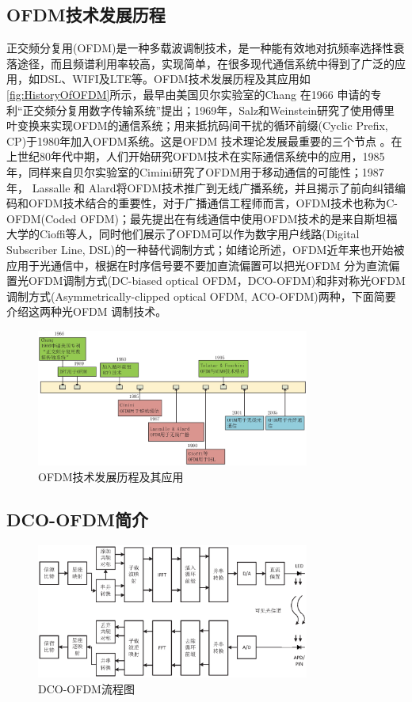 \subsection{OFDM技术发展历程}
正交频分复用(OFDM)是一种多载波调制技术，是一种能有效地对抗频率选择性衰落途径，而且频谱利用率较高，实现简单，在很多现代通信系统中得到了广泛的应用，如DSL、WIFI及LTE等。OFDM技术发展历程及其应用如
\autoref{fig:HistoryOfOFDM}所示，最早由美国贝尔实验室的Chang 在1966 申请的专利“正交频分复用数字传输系统”提出；1969年，Salz和Weinstein研究了使用傅里叶变换来实现OFDM的通信系统；用来抵抗码间干扰的循环前缀(Cyclic Prefix, CP)于1980年加入OFDM系统。这是OFDM 技术理论发展最重要的三个节点
\cite{armstrong2009ofdm}。在上世纪80年代中期，人们开始研究OFDM技术在实际通信系统中的应用，1985年，同样来自贝尔实验室的Cimini研究了OFDM用于移动通信的可能性；1987年， Lassalle 和 Alard将OFDM技术推广到无线广播系统，并且揭示了前向纠错编码和OFDM技术结合的重要性，对于广播通信工程师而言，OFDM技术也称为C-OFDM(Coded OFDM)；最先提出在有线通信中使用OFDM技术的是来自斯坦福大学的Cioffi等人，同时他们展示了OFDM可以作为数字用户线路(Digital Subscriber Line, DSL)的一种替代调制方式；如绪论所述，OFDM近年来也开始被应用于光通信中，根据在时序信号要不要加直流偏置可以把光OFDM 分为直流偏置光OFDM调制方式(DC-biased optical OFDM，DCO-OFDM)和非对称光OFDM调制方式(Asymmetrically-clipped optical OFDM, ACO-OFDM)两种，下面简要介绍这两种光OFDM 调制技术。
\begin{figure}[htbp]
    \centering
    \includegraphics[width=0.8\textwidth]{figures/chapter-2/HistoryOfOFDM.eps}
    \caption{OFDM技术发展历程及其应用}
    \label{fig:HistoryOfOFDM}
\end{figure}
\subsection{DCO-OFDM简介}
\begin{figure}[htbp]
    \centering
    \includegraphics[width=0.8\textwidth]{figures/chapter-2/DCO-OFDMStructure.eps}
    \caption{DCO-OFDM流程图}
    \label{fig:DCO-OFDMStructure}
\end{figure}

